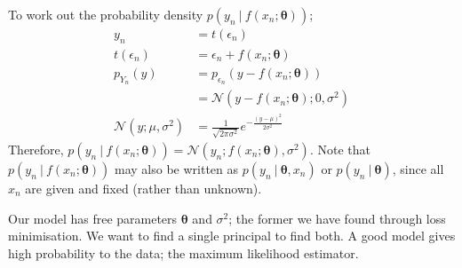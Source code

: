 \documentclass[a4paper, 12pt]{article}
\renewcommand{\vec}[1]{\boldsymbol{#1}}
\begin{document}
            To work out the probability density $p(y_n\ |\ f(x_n; \vec{\theta}))$;
            \begin{align*}
                y_n & = t(\epsilon_n) \\
                t(\epsilon_n) & = \epsilon_n + f(x_n; \vec{\theta}) \\
                p_{Y_n}(y) & = p_{\epsilon_n}(y - f(x_n; \vec{\theta})) \\
                & = \mathcal{N}(y - f(x_n; \vec{\theta}); 0, \sigma^2) \\
                \mathcal{N}(y; \mu, \sigma^2) & = \frac{1}{\sqrt{2 \pi \sigma^2}}e^{-\frac{(y - \mu)^2}{2\sigma^2}}
            \end{align*}
            Therefore, $p(y_n\ |\ f(x_n; \vec{\theta})) = \mathcal{N}(y_n; f(x_n; \vec{\theta}), \sigma^2)$.
            Note that $p(y_n\ |\ f(x_n; \vec{\theta}))$ may also be written as $p(y_n\ |\ \vec{\theta}, x_n)$ or $p(y_n\ |\ \vec{\theta})$, since all $x_n$ are given and fixed (rather than unknown).
            \medskip

            Our model has free parameters $\vec{\theta}$ and $\sigma^2$; the former we have found through loss minimisation.
            We want to find a single principal to find both.
            A good model gives high probability to the data; the maximum likelihood estimator.
            \medskip
\end{document}
